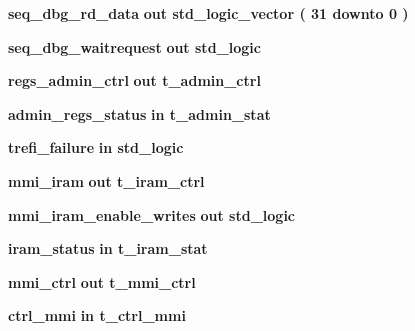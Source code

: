 \begin{DoxyCompactItemize}
\item 
{\bf seq\+\_\+dbg\+\_\+rd\+\_\+data}  {\bfseries {\bfseries \textcolor{keywordflow}{out}\textcolor{vhdlchar}{ }}} {\bfseries \textcolor{comment}{std\+\_\+logic\+\_\+vector}\textcolor{vhdlchar}{ }\textcolor{vhdlchar}{(}\textcolor{vhdlchar}{ }\textcolor{vhdlchar}{ } \textcolor{vhdldigit}{31} \textcolor{vhdlchar}{ }\textcolor{keywordflow}{downto}\textcolor{vhdlchar}{ }\textcolor{vhdlchar}{ } \textcolor{vhdldigit}{0} \textcolor{vhdlchar}{ }\textcolor{vhdlchar}{)}\textcolor{vhdlchar}{ }} 
\item 
{\bf seq\+\_\+dbg\+\_\+waitrequest}  {\bfseries {\bfseries \textcolor{keywordflow}{out}\textcolor{vhdlchar}{ }}} {\bfseries \textcolor{comment}{std\+\_\+logic}\textcolor{vhdlchar}{ }} 
\item 
{\bf regs\+\_\+admin\+\_\+ctrl}  {\bfseries {\bfseries \textcolor{keywordflow}{out}\textcolor{vhdlchar}{ }}} {\bfseries {\bfseries {\bf t\+\_\+admin\+\_\+ctrl}} \textcolor{vhdlchar}{ }} 
\item 
{\bf admin\+\_\+regs\+\_\+status}  {\bfseries {\bfseries \textcolor{keywordflow}{in}\textcolor{vhdlchar}{ }}} {\bfseries {\bfseries {\bf t\+\_\+admin\+\_\+stat}} \textcolor{vhdlchar}{ }} 
\item 
{\bf trefi\+\_\+failure}  {\bfseries {\bfseries \textcolor{keywordflow}{in}\textcolor{vhdlchar}{ }}} {\bfseries \textcolor{comment}{std\+\_\+logic}\textcolor{vhdlchar}{ }} 
\item 
{\bf mmi\+\_\+iram}  {\bfseries {\bfseries \textcolor{keywordflow}{out}\textcolor{vhdlchar}{ }}} {\bfseries {\bfseries {\bf t\+\_\+iram\+\_\+ctrl}} \textcolor{vhdlchar}{ }} 
\item 
{\bf mmi\+\_\+iram\+\_\+enable\+\_\+writes}  {\bfseries {\bfseries \textcolor{keywordflow}{out}\textcolor{vhdlchar}{ }}} {\bfseries \textcolor{comment}{std\+\_\+logic}\textcolor{vhdlchar}{ }} 
\item 
{\bf iram\+\_\+status}  {\bfseries {\bfseries \textcolor{keywordflow}{in}\textcolor{vhdlchar}{ }}} {\bfseries {\bfseries {\bf t\+\_\+iram\+\_\+stat}} \textcolor{vhdlchar}{ }} 
\item 
{\bf mmi\+\_\+ctrl}  {\bfseries {\bfseries \textcolor{keywordflow}{out}\textcolor{vhdlchar}{ }}} {\bfseries {\bfseries {\bf t\+\_\+mmi\+\_\+ctrl}} \textcolor{vhdlchar}{ }} 
\item 
{\bf ctrl\+\_\+mmi}  {\bfseries {\bfseries \textcolor{keywordflow}{in}\textcolor{vhdlchar}{ }}} {\bfseries {\bfseries {\bf t\+\_\+ctrl\+\_\+mmi}} \textcolor{vhdlchar}{ }} 
\item 

\end{DoxyCompactItemize}
